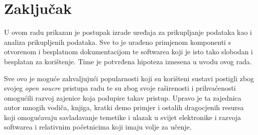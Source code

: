 \chapter{Zaključak}\label{ch:Zakljucak}
U ovom radu prikazan je postupak izrade uređaja za prikupljanje podataka kao i analiza prikupljenih podataka.
Sve to je urađeno primjenom komponenti s otvorenom i besplatnom dokumentacijom te softwarea koji je isto tako slobodan i besplatan za korištenje.
Time je potvrđena hipoteza iznesena u uvodu ovog rada.

Sve ovo je moguće zahvaljujući popularnosti koji su korišteni sustavi postigli zbog svojeg \textit{open soucre} pristupa radu te su zbog svoje raširenosti i prihvaćenosti omogućili razvoj zajenice koja podupire takav pristup.
Upravo je ta zajednica autor mnogih vodiča, knjiga, kratki demo primjer i ostalih dragocjenih resursa koji omogućavaju savladavanje temetike i ulazak u svijet elektronike i razvoja softwarea i relativnim početnicima koji imaju volje za učenje.